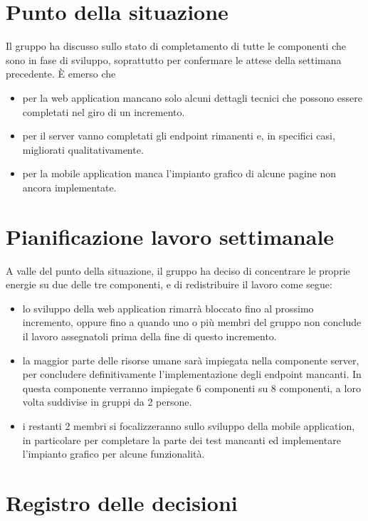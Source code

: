 \documentclass{article}
\begin{document}
\section{Punto della situazione}%
\label{sec:punto_della_situazione}

Il gruppo ha discusso sullo stato di completamento di tutte le componenti che sono in fase di sviluppo, soprattutto per confermare le attese della settimana precedente.
È emerso che
\begin{itemize}
  \item per la web application mancano solo alcuni dettagli tecnici che possono essere completati nel giro di un incremento.
  \item per il server vanno completati gli endpoint rimanenti e, in specifici casi, migliorati qualitativamente.
  \item per la mobile application manca l'impianto grafico di alcune pagine non ancora implementate.
\end{itemize}

\section{Pianificazione lavoro settimanale}%
\label{sec:pianificazione_lavoro_settimanale}

A valle del punto della situazione, il gruppo ha deciso di concentrare le proprie energie su due delle tre componenti, e di redistribuire il lavoro come segue:
\begin{itemize}
  \item lo sviluppo della web application rimarrà bloccato fino al prossimo incremento, oppure fino a quando uno o più membri del gruppo non conclude il lavoro assegnatoli prima della fine di questo incremento.
  \item la maggior parte delle risorse umane sarà impiegata nella componente server, per concludere definitivamente l'implementazione degli endpoint mancanti. In questa componente verranno impiegate 6 componenti su 8 componenti, a loro volta suddivise in gruppi da 2 persone.
  \item i restanti 2 membri si focalizzeranno sullo sviluppo della mobile application, in particolare per completare la parte dei test mancanti ed implementare l'impianto grafico per alcune funzionalità.
\end{itemize}

\newpage
\section{Registro delle decisioni}%
\label{sec:registro_delle_decisioni}
\end{document}
